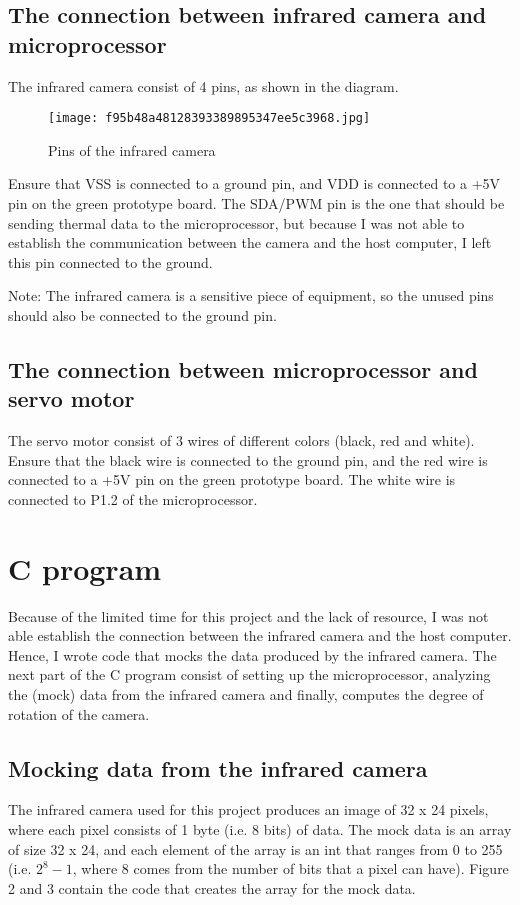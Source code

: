 \documentclass[12pt]{article}
\begin{document}
\subsection {The connection between infrared camera and microprocessor}
The infrared camera consist of 4 pins, as shown in the diagram.

\begin{figure}[h]
\texttt{[image: f95b48a48128393389895347ee5c3968.jpg]}
\centering
\caption{Pins of the infrared camera}
\end{figure}

Ensure that VSS is connected to a ground pin, and VDD is connected to a +5V pin on the green prototype board. The SDA/PWM pin is the one that should be sending thermal data to the microprocessor, but because I was not able to establish the communication between the camera and the host computer, I left this pin connected to the ground.

Note: The infrared camera is a sensitive piece of equipment, so the unused pins should also be connected to the ground pin. 

\subsection {The connection between microprocessor and servo motor}
The servo motor consist of 3 wires of different colors (black, red and white). Ensure that the black wire is connected to the ground pin, and the red wire is connected to a +5V pin on the green prototype board. The white wire is connected to P1.2 of the microprocessor.

\section {C program}
Because of the limited time for this project and the lack of resource, I was not able establish the connection between the infrared camera and the host computer. Hence, I wrote code that mocks the data produced by the infrared camera. The next part of the C program consist of setting up the microprocessor, analyzing the (mock) data from the infrared camera and finally, computes the degree of rotation of the camera.

\subsection {Mocking data from the infrared camera}
The infrared camera used for this project produces an image of 32 x 24 pixels, where each pixel consists of 1 byte (i.e. 8 bits) of data. The mock data is an array of size 32 x 24, and each element of the array is an int that ranges from 0 to 255 (i.e. $2^8 - 1$, where 8 comes from the number of bits that a pixel can have). Figure 2 and 3 contain the code that creates the array for the mock data.
\end{document}
